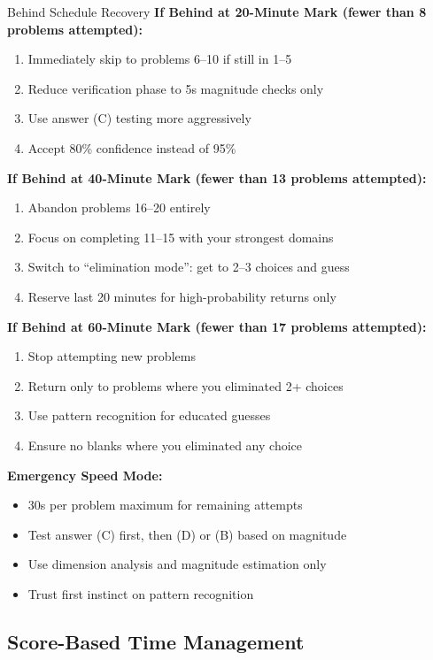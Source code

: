 \documentclass{article}
\begin{document}
\begin{timebox}{Behind Schedule Recovery}
\textbf{If Behind at 20-Minute Mark (fewer than 8 problems attempted):}
\begin{enumerate}[nosep]
\item Immediately skip to problems 6--10 if still in 1--5
\item Reduce verification phase to 5s magnitude checks only
\item Use answer (C) testing more aggressively
\item Accept 80\% confidence instead of 95\%
\end{enumerate}

\textbf{If Behind at 40-Minute Mark (fewer than 13 problems attempted):}
\begin{enumerate}[nosep]
\item Abandon problems 16--20 entirely
\item Focus on completing 11--15 with your strongest domains
\item Switch to ``elimination mode'': get to 2--3 choices and guess
\item Reserve last 20 minutes for high-probability returns only
\end{enumerate}

\textbf{If Behind at 60-Minute Mark (fewer than 17 problems attempted):}
\begin{enumerate}[nosep]
\item Stop attempting new problems
\item Return only to problems where you eliminated 2+ choices
\item Use pattern recognition for educated guesses
\item Ensure no blanks where you eliminated any choice
\end{enumerate}

\textbf{Emergency Speed Mode:}
\begin{itemize}[nosep]
\item 30s per problem maximum for remaining attempts
\item Test answer (C) first, then (D) or (B) based on magnitude
\item Use dimension analysis and magnitude estimation only
\item Trust first instinct on pattern recognition
\end{itemize}
\end{timebox}

\subsection{Score-Based Time Management}
\end{document}
